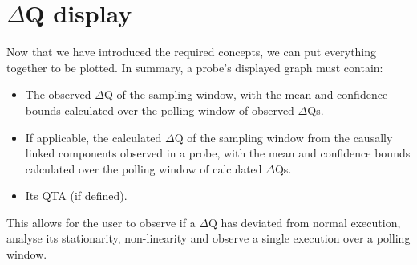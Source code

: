 \section{$\Delta$Q display}
    Now that we have introduced the required concepts, we can put everything together to be plotted. In summary, a probe's displayed graph must contain:
    \begin{itemize}
        \item The observed $\Delta$Q of the sampling window, with the mean and confidence bounds calculated over the polling window of observed $\Delta$Qs.
        \item If applicable, the calculated $\Delta$Q of the sampling window from the causally linked components observed in a probe, with the mean and confidence bounds calculated over the polling window of calculated $\Delta$Qs.
        \item Its QTA (if defined).
    \end{itemize}
    This allows for the user to observe if a $\Delta$Q has deviated from normal execution, analyse its stationarity, non-linearity and observe a single execution over a polling window.

